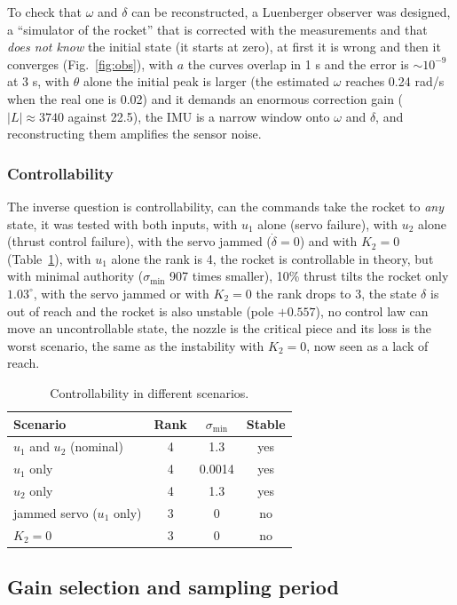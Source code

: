 \documentclass[article, 11pt]{IEEEtran}   %
\begin{document}
To check that $\omega$ and $\delta$ can be reconstructed, a Luenberger observer was designed, a ``simulator of the rocket'' that is corrected with the measurements and that \emph{does not know} the initial state (it starts at zero), at first it is wrong and then it converges (Fig.~\ref{fig:obs}), with $a$ the curves overlap in 1 s and the error is $\sim10^{-9}$ at 3 s, with $\theta$ alone the initial peak is larger (the estimated $\omega$ reaches 0.24 rad/s when the real one is 0.02) and it demands an enormous correction gain ($|L|\approx3740$ against 22.5), the IMU is a narrow window onto $\omega$ and $\delta$, and reconstructing them amplifies the sensor noise.

\subsubsection{Controllability}
The inverse question is controllability, can the commands take the rocket to \emph{any} state, it was tested with both inputs, with $u_1$ alone (servo failure), with $u_2$ alone (thrust control failure), with the servo jammed ($\dot\delta=0$) and with $K_2=0$ (Table~\ref{tab:ctrb}), with $u_1$ alone the rank is 4, the rocket is controllable in theory, but with minimal authority ($\sigma_{\min}$ 907 times smaller), 10\% thrust tilts the rocket only $1.03^\circ$, with the servo jammed or with $K_2=0$ the rank drops to 3, the state $\delta$ is out of reach and the rocket is also unstable (pole $+0.557$), no control law can move an uncontrollable state, the nozzle is the critical piece and its loss is the worst scenario, the same as the instability with $K_2=0$, now seen as a lack of reach.

\begin{table}[!t]
\centering\small
\caption{Controllability in different scenarios.}\label{tab:ctrb}
\begin{tabular}{lccc}
\toprule
Scenario & Rank & $\sigma_{\min}$ & Stable\\
\midrule
$u_1$ and $u_2$ (nominal) & 4 & 1.3 & yes\\
$u_1$ only & 4 & 0.0014 & yes\\
$u_2$ only & 4 & 1.3 & yes\\
jammed servo ($u_1$ only) & 3 & 0 & no\\
$K_2=0$ & 3 & 0 & no\\
\bottomrule
\end{tabular}
\end{table}


\subsection{Gain selection and sampling period}
\end{document}
